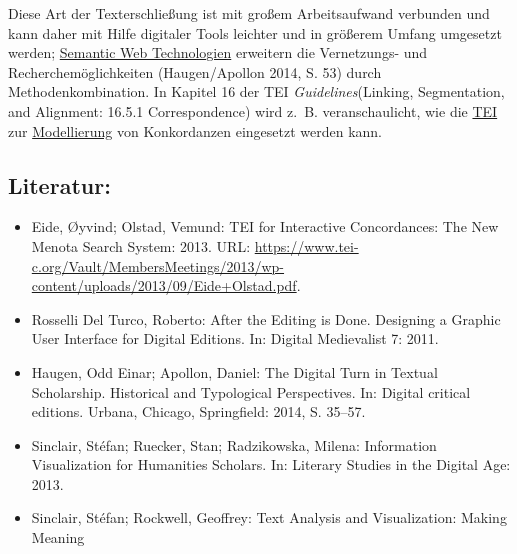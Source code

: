 \documentclass{article}
\begin{document}
        Diese Art der Texterschließung ist mit großem Arbeitsaufwand verbunden und kann
                  daher mit Hilfe digitaler Tools leichter und in größerem Umfang umgesetzt werden;
                     \href{http://gams.uni-graz.at/o:konde.168}{Semantic Web Technologien}
                  erweitern die Vernetzungs- und Recherchemöglichkeiten (Haugen/Apollon 2014,
                     S. 53) durch Methodenkombination. In Kapitel 16 der TEI \emph{Guidelines}(Linking, Segmentation, and Alignment: 16.5.1 Correspondence) wird
                  z. B. veranschaulicht, wie die \href{http://gams.uni-graz.at/o:konde.178}{TEI} zur \href{http://gams.uni-graz.at/o:konde.137}{Modellierung}
                  von Konkordanzen eingesetzt werden kann.\\
            
        \subsection*{Literatur:}\begin{itemize}\item Eide, Øyvind; Olstad, Vemund: TEI for Interactive Concordances: The New Menota Search
                              System: 2013. URL: \url{https://www.tei-c.org/Vault/MembersMeetings/2013/wp-content/uploads/2013/09/Eide+Olstad.pdf}.\item Rosselli Del Turco, Roberto: After the Editing is Done. Designing a Graphic User
                              Interface for Digital Editions. In: Digital Medievalist 7: 2011.\item Haugen, Odd Einar; Apollon, Daniel: The Digital Turn in Textual Scholarship. Historical and
                              Typological Perspectives. In: Digital critical editions. Urbana, Chicago, Springfield: 2014, S. 35–57.\item Sinclair, Stéfan; Ruecker, Stan; Radzikowska, Milena: Information Visualization for Humanities
                              Scholars. In: Literary Studies in the Digital Age: 2013.\item Sinclair, Stéfan; Rockwell, Geoffrey: Text Analysis and Visualization: Making Meaning

\end{itemize}
\end{document}
